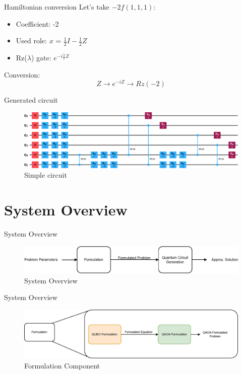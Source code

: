 \documentclass[14pt, aspectratio=169]{beamer}
\begin{document}
\begin{frame}{Hamiltonian conversion}
    Let's take $-2f(1,1,1)$:
    \begin{itemize}
        \item Coefficient: -2
        \item Used role: \({x}\) = $\frac{1}{2}I - \frac{1}{2}Z$
        \item Rz($\lambda$) gate: $e^{-i\frac{\lambda}{2}Z}$
    \end{itemize}
    \vspace{2mm}
    Conversion:
    \[Z \rightarrow e^{-iZ} \rightarrow Rz(-2)\]
\end{frame}
\begin{frame}{Generated circuit}
    \begin{figure}
        \centering
        \includegraphics[width=1\textwidth]{images/illustration/6_qubit_circuit.eps}
        \caption{Simple circuit}
        \label{fig:6_qubit_circuit}
    \end{figure}
\end{frame}

\section{System Overview}
\begin{frame}{System Overview}
    \begin{figure}
        \centering
        \includegraphics[width=\linewidth]{images/Diagram/SystemOverview.eps}
        \caption{System Overview}
        \label{fig:system_overview}
    \end{figure}
\end{frame}

\begin{frame}{System Overview}
    \begin{figure}
        \centering
        \includegraphics[width=\linewidth]{images/Diagram/Formulation.eps}
        \caption{Formulation Component}
        \label{fig:formulation}
    \end{figure}
\end{frame}
\end{document}
